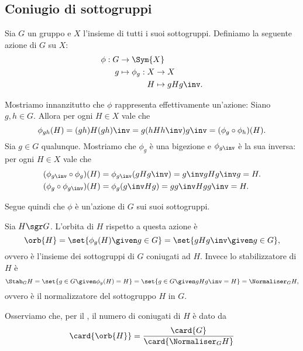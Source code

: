 \subsection{Coniugio di sottogruppi}
Sia $G$ un gruppo e $X$ l'insieme di tutti i suoi sottogruppi. Definiamo la seguente azione di $G$ su $X$:
\begin{align*}
    \phi : G &\to \Sym{X}\\
           g &\mapsto 
    \begin{aligned}[t]
        \phi_g : X &\to X\\
                 H &\mapsto gHg\inv.
    \end{aligned}
\end{align*}

Mostriamo innanzitutto che $\phi$ rappresenta effettivamente un'azione:
 Siano $g, h \in G$. Allora per ogni $H \in X$ vale che \[
    \phi_{gh}(H) = (gh)H(gh)\inv = g(hHh\inv)g\inv = (\phi_g \circ \phi_h)(H).
\]
 Sia $g \in G$ qualunque. Mostriamo che $\phi_g$ è una bigezione e $\phi_{g\inv}$ è la sua inversa: per ogni $H \in X$ vale che \begin{align*}
    &(\phi_{g\inv} \circ \phi_g)(H) = \phi_{g\inv}(gHg\inv) = g\inv gHg\inv g = H.\\
    &(\phi_{g} \circ \phi_{g\inv})(H) = \phi_{g}(g\inv Hg) = gg\inv Hgg\inv = H.
\end{align*}

Segue quindi che $\phi$ è un'azione di $G$ sui suoi sottogruppi. 

Sia $H \sgr G$. L'orbita di $H$ rispetto a questa azione è \[
    \orb{H} = \set{\phi_g(H) \given g \in G} = \set{gHg\inv \given g \in G},
\] ovvero è l'insieme dei sottogruppi di $G$ coniugati ad $H$. Invece lo stabilizzatore di $H$ è \[
    \Stab_{G}{H} = \set{g \in G \given \phi_g(H) = H}
    = \set{g \in G \given gHg\inv = H} = \Normaliser_{G}{H},
\] ovvero è il normalizzatore del sottogruppo $H$ in $G$.

Osserviamo che, per il , il numero di coniugati di $H$ è dato da \[
    \card{\orb{H}} = \frac{\card{G}}{\card{\Normaliser_{G}{H}}}    
\]

